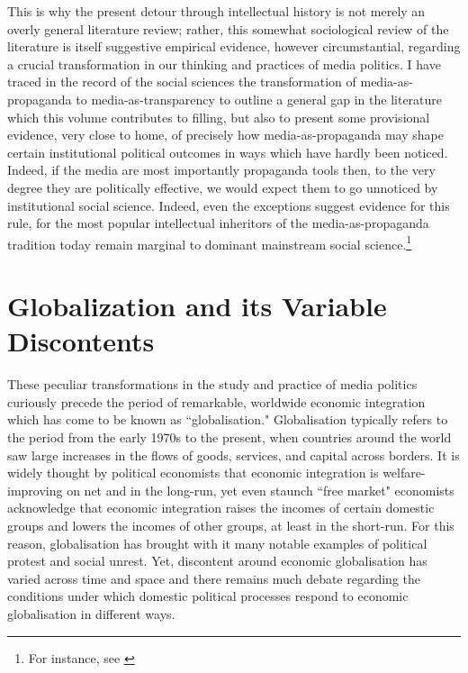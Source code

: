 This is why the present detour through intellectual history is not merely an overly general
literature review; rather, this somewhat sociological review of the literature is itself suggestive
empirical evidence, however circumstantial, regarding a crucial transformation in our thinking and
practices of media politics. I have traced in the record of the social sciences the transformation
of media-as-propaganda to media-as-transparency to outline a general gap in the literature which
this volume contributes to filling, but also to present some provisional evidence, very close to
home, of precisely how media-as-propaganda may shape certain institutional political outcomes in
ways which have hardly been noticed. Indeed, if the media are most importantly propaganda tools
then, to the very degree they are politically effective, we would expect them to go unnoticed by
institutional social science. Indeed, even the exceptions suggest evidence for this rule, for the
most popular intellectual inheritors of the media-as-propaganda tradition today remain marginal to
dominant mainstream social science.\footnote{For instance, see
\citealt{Herman:1988ta,mcchesney2000rich,luhmann2000reality}}


\section{Globalization and its Variable Discontents}

These peculiar transformations in the study and practice of media politics curiously precede the
period of remarkable, worldwide economic integration which has come to be known as ``globalisation."
Globalisation typically refers to the period from the early 1970s to the present, when countries
around the world saw large increases in the flows of goods, services, and capital across borders. It
is widely thought by political economists that economic integration is welfare-improving on net and
in the long-run, yet even staunch ``free market" economists acknowledge that economic integration
raises the incomes of certain domestic groups and lowers the incomes of other groups, at least in
the short-run. For this reason, globalisation has brought with it many notable examples of political
protest and social unrest. Yet, discontent around economic globalisation has varied across time and
space and there remains much debate regarding the conditions under which domestic political
processes respond to economic globalisation in different ways.

